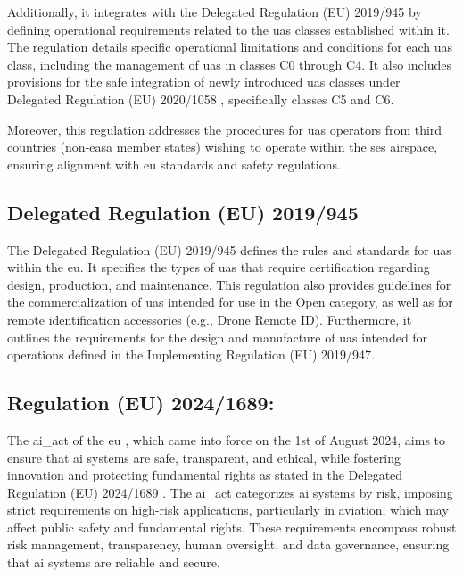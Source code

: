 Additionally, it integrates with the Delegated Regulation (EU) 2019/945 \autocite{eu-945-2019} by defining operational requirements related to the \gls{uas} classes established within it. The regulation details specific operational limitations and conditions for each \gls{uas} class, including the management of \gls{uas} in classes C0 through C4. It also includes provisions for the safe integration of newly introduced \gls{uas} classes under Delegated Regulation (EU) 2020/1058 \autocite{eu-1058-2020}, specifically classes C5 and C6.

Moreover, this regulation addresses the procedures for \gls{uas} operators from third countries (non-\gls{easa} member states) wishing to operate within the \gls{ses} airspace, ensuring alignment with \gls{eu} standards and safety regulations.

\subsection{Delegated Regulation (EU) 2019/945}
The Delegated Regulation (EU) 2019/945 \autocite{eu-945-2019} defines the rules and standards for \gls{uas} within the \gls{eu}. It specifies the types of \gls{uas} that require certification regarding design, production, and maintenance. This regulation also provides guidelines for the commercialization of \gls{uas} intended for use in the Open category, as well as for remote identification accessories (e.g., Drone Remote ID). Furthermore, it outlines the requirements for the design and manufacture of \gls{uas} intended for operations defined in the Implementing Regulation (EU) 2019/947.

\subsection{Regulation (EU) 2024/1689: }
The \gls{ai_act} of the \gls{eu} \autocite{AIActIntoForce}, which came into force on the 1st of August 2024, aims to ensure that \gls{ai} systems are safe, transparent, and ethical, while fostering innovation and protecting fundamental rights as stated in the Delegated Regulation (EU) 2024/1689 \autocite{eu-1689-2024}. The \gls{ai_act} categorizes \gls{ai} systems by risk, imposing strict requirements on high-risk applications, particularly in aviation, which may affect public safety and fundamental rights. These requirements encompass robust risk management, transparency, human oversight, and data governance, ensuring that \gls{ai} systems are reliable and secure.

